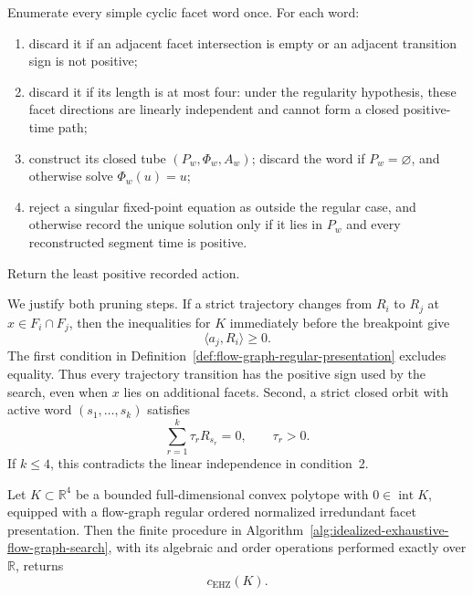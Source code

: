 \begin{algorithm}
\label{alg:idealized-exhaustive-flow-graph-search}
Enumerate every simple cyclic facet word once.  For each word:
\begin{enumerate}
  \item discard it if an adjacent facet intersection is empty or an adjacent
    transition sign is not positive;
  \item discard it if its length is at most four: under the regularity
    hypothesis, these facet directions are linearly independent and cannot
    form a closed positive-time path;
  \item construct its closed tube \((P_w,\Phi_w,A_w)\); discard the word
    if \(P_w=\varnothing\), and otherwise solve \(\Phi_w(u)=u\);
  \item reject a singular fixed-point equation as outside the regular case,
    and otherwise record the unique solution only if it lies in \(P_w\) and
    every reconstructed segment time is positive.
\end{enumerate}
Return the least positive recorded action.
\end{algorithm}

We justify both pruning steps.  If a strict trajectory changes from \(R_i\) to
\(R_j\) at \(x\in F_i\cap F_j\), then the inequalities
for \(K\) immediately before the breakpoint give
\[
  \langle a_j,R_i\rangle\geq0.
\]
The first condition in
Definition~\ref{def:flow-graph-regular-presentation} excludes equality.  Thus
every trajectory transition has the positive sign used by the search, even
when \(x\) lies on additional facets.  Second, a strict closed orbit with
active word \((s_1,\ldots,s_k)\) satisfies
\[
  \sum_{r=1}^k\tau_rR_{s_r}=0,
  \qquad \tau_r>0.
\]
If \(k\leq4\), this contradicts the linear independence in condition~2.

\begin{theorem}
\label{thm:exact-flow-graph-correctness}
Let \(K\subset\mathbb R^4\) be a bounded full-dimensional convex polytope
with \(0\in\operatorname{int}K\), equipped with a flow-graph regular ordered
normalized irredundant facet presentation.  Then the finite procedure in
Algorithm~\ref{alg:idealized-exhaustive-flow-graph-search}, with its algebraic
and order operations performed exactly over \(\mathbb R\), returns
\[
  c_{\mathrm{EHZ}}(K).
\]
\end{theorem}

